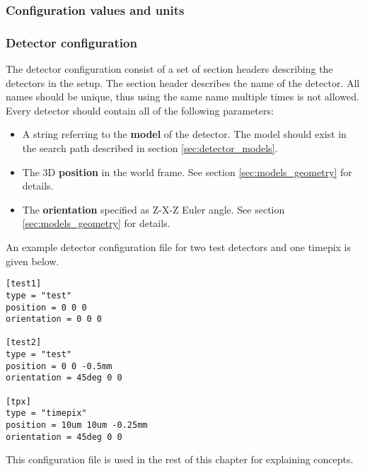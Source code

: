 \subsubsection{Configuration values and units}
\label{sec:config_values}
\todo

\subsubsection{Detector configuration}
\label{sec:detector_config}
The detector configuration consist of a set of section headers describing the detectors in the setup. The section header describes the name of the detector. All names should be unique, thus using the same name multiple times is not allowed. Every detector should contain all of the following parameters:
\begin{itemize}
\item A string referring to the \textbf{model} of the detector. The model should exist in the search path described in section \ref{sec:detector_models}.
\item The 3D \textbf{position} in the world frame. See section \ref{sec:models_geometry} for details.
\item The \textbf{orientation} specified as Z-X-Z Euler angle. See section \ref{sec:models_geometry} for details.
\end{itemize}

An example detector configuration file for two test detectors and one timepix is given below. 
\begin{verbatim}
[test1]
type = "test"
position = 0 0 0
orientation = 0 0 0

[test2]
type = "test"
position = 0 0 -0.5mm
orientation = 45deg 0 0

[tpx]
type = "timepix"
position = 10um 10um -0.25mm
orientation = 45deg 0 0
\end{verbatim}
This configuration file is used in the rest of this chapter for explaining concepts. 

